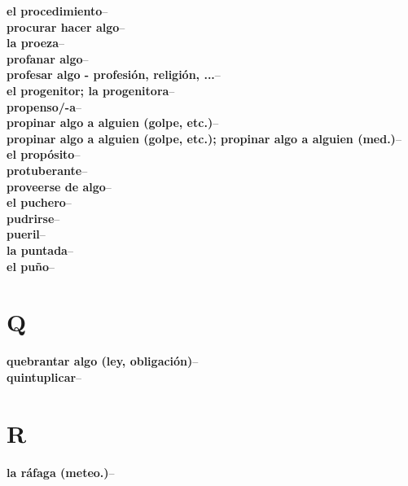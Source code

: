 \textbf{el procedimiento}\enspace--\\
\textbf{procurar hacer algo}\enspace--\\
\textbf{la proeza}\enspace--\\
\textbf{profanar algo}\enspace--\\
\textbf{profesar algo - profesión, religión, ...}\enspace--\\
\textbf{el progenitor; la progenitora}\enspace--\\
\textbf{propenso/-a}\enspace--\\
\textbf{propinar algo a alguien (golpe, etc.)}\enspace--\\
\textbf{propinar algo a alguien (golpe, etc.); propinar algo a alguien (med.)}\enspace--\\
\textbf{el propósito}\enspace--\\
\textbf{protuberante}\enspace--\\
\textbf{proveerse de algo}\enspace--\\
\textbf{el puchero}\enspace--\\
\textbf{pudrirse}\enspace--\\
\textbf{pueril}\enspace--\\
\textbf{la puntada}\enspace--\\
\textbf{el puño}\enspace--\\
\hypertarget{a16}{\section*{Q}}
\textbf{quebrantar algo (ley, obligación)}\enspace--\\
\textbf{quintuplicar}\enspace--\\
\hypertarget{a17}{\section*{R}}
\textbf{la ráfaga (meteo.)}\enspace--\\
